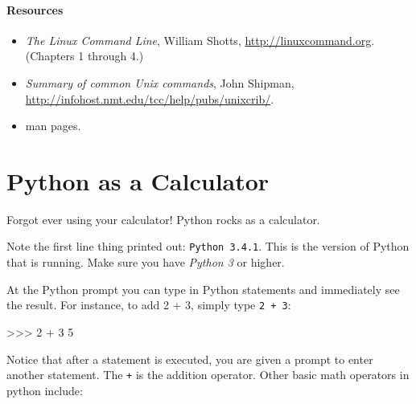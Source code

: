 \documentclass[11pt]{cselabheader}
\begin{document}
\paragraph*{Resources}

\begin{itemize}
  \item \textit{The Linux Command Line}, William Shotts,
    \url{http://linuxcommand.org}. (Chapters 1 through 4.)
  \item \textit{Summary of common Unix commands}, John Shipman,
    \url{http://infohost.nmt.edu/tcc/help/pubs/unixcrib/}.
  \item man pages.
\end{itemize}

\pagebreak
\section{Python as a Calculator}
\label{sec:python-calc}
Forgot ever using your calculator! Python rocks as a calculator.


Note the first line thing printed out: \texttt{Python 3.4.1}. This is the
version of Python that is running. Make sure you have \emph{Python 3} or higher.

At the Python prompt \pyconinline{>>>} you can type in Python statements and
immediately see the result. For instance, to add 2 + 3, simply type \texttt{2 +
3}: 

\begin{pyconcode}
>>> 2 + 3
5
\end{pyconcode}

Notice that after a statement is executed, you are given a prompt to enter
another statement. The \texttt{+} is the addition operator. Other basic math
operators in python include:
\end{document}
